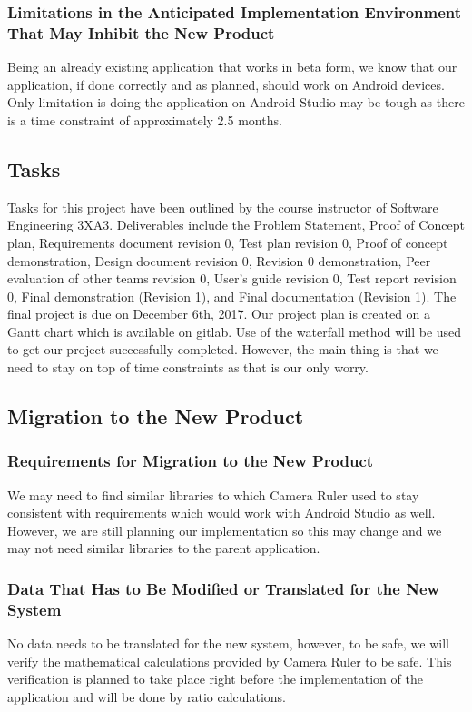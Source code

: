 \documentclass[12pt, titlepage]{article}
\begin{document}
\subsubsection{Limitations in the Anticipated Implementation Environment That May Inhibit the New Product}
Being an already existing application that works in beta form, we know that our application, if done correctly and as planned, should work on Android devices. Only limitation is doing the application on Android Studio may be tough as there is a time constraint of approximately 2.5 months.
\subsection{Tasks}
Tasks for this project have been outlined by the course instructor of Software Engineering 3XA3. Deliverables include the Problem Statement, Proof of Concept plan, Requirements document revision 0, Test plan revision 0, Proof of concept demonstration, Design document revision 0, Revision 0 demonstration, Peer evaluation of other teams revision 0, User’s guide revision 0, Test report revision 0, Final demonstration (Revision 1), and Final documentation (Revision 1).  The final project is due on December 6th, 2017. Our project plan is created on a Gantt chart which is available on gitlab. Use of the waterfall method will be used to get our project successfully completed. However, the main thing is that we need to stay on top of time constraints as that is our only worry.
\subsection{Migration to the New Product}
\subsubsection{Requirements for Migration to the New Product}
We may need to find similar libraries to which Camera Ruler used to stay consistent with requirements which would work with Android Studio as well. However, we are still planning our implementation so this may change and we may not need similar libraries to the parent application.

\subsubsection{Data That Has to Be Modified or Translated for the New System}
No data needs to be translated for the new system, however, to be safe, we will verify the mathematical calculations provided by Camera Ruler to be safe. This verification is planned to take place right before the implementation of the application and will be done by ratio calculations. 
\end{document}
